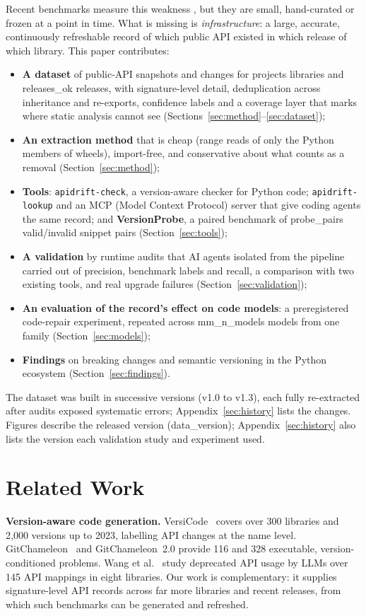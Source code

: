 \documentclass[10pt,twocolumn,letterpaper]{article}
\begin{document}
Recent benchmarks measure this weakness \cite{versicode,gitchameleon,gitchameleon2,wang2024deprecated}, but they
are small, hand-curated or frozen at a point in time. What is missing is \emph{infrastructure}: a large, accurate,
continuously refreshable record of which public API existed in which release of which library. This paper
contributes:
\begin{itemize}\setlength\itemsep{0pt}
\item \textbf{A dataset} of public-API snapshots and changes for {{projects}} libraries and {{releases_ok}} releases,
with signature-level detail, deduplication across inheritance and re-exports, confidence labels and a coverage layer
that marks where static analysis cannot see (Sections~\ref{sec:method}--\ref{sec:dataset});
\item \textbf{An extraction method} that is cheap (range reads of only the Python members of wheels), import-free,
and conservative about what counts as a removal (Section~\ref{sec:method});
\item \textbf{Tools}: \texttt{apidrift-check}, a version-aware checker for Python code; \texttt{apidrift-lookup} and an
MCP (Model Context Protocol) server that give coding agents the same record; and \textbf{VersionProbe}, a paired benchmark of {{probe_pairs}}
valid/invalid snippet pairs (Section~\ref{sec:tools});
\item \textbf{A validation} by runtime audits that AI agents isolated from the pipeline carried out of precision, benchmark labels and recall, a comparison
with two existing tools, and real upgrade failures (Section~\ref{sec:validation});
\item \textbf{An evaluation of the record's effect on code models}: a preregistered code-repair experiment, repeated across
{{mm_n_models}} models from one family (Section~\ref{sec:models});
\item \textbf{Findings} on breaking changes and semantic versioning in the Python ecosystem (Section~\ref{sec:findings}).
\end{itemize}
The dataset was built in successive versions (v1.0 to v1.3), each fully re-extracted after audits exposed
systematic errors; Appendix~\ref{sec:history} lists the changes. Figures describe the released version
({{data_version}}); Appendix~\ref{sec:history} also lists the version each validation study and experiment
used.

\section{Related Work}
\textbf{Version-aware code generation.} VersiCode~\cite{versicode} covers over 300 libraries and 2,000 versions
up to 2023, labelling API changes at the name level. GitChameleon~\cite{gitchameleon} and GitChameleon~2.0
\cite{gitchameleon2} provide 116 and 328 executable, version-conditioned problems. Wang et
al.~\cite{wang2024deprecated} study deprecated API usage by LLMs over 145 API mappings in eight libraries. Our work
is complementary: it supplies signature-level API records across far more libraries and recent releases, from
which such benchmarks can be generated and refreshed.
\end{document}
